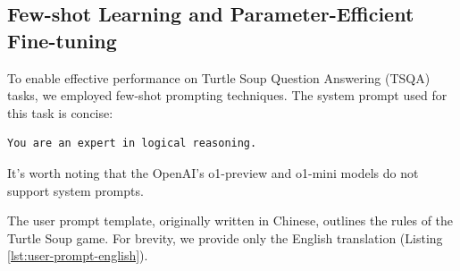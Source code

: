 \documentclass[conference]{IEEEtran}
\begin{document}
\subsection{Few-shot Learning and Parameter-Efficient Fine-tuning}

To enable effective performance on Turtle Soup Question Answering (TSQA) tasks, we employed few-shot prompting techniques. The system prompt used for this task is concise:

\begin{verbatim}
You are an expert in logical reasoning.
\end{verbatim}

It's worth noting that the OpenAI's o1-preview and o1-mini models do not support system prompts.

The user prompt template, originally written in Chinese, outlines the rules of the Turtle Soup game. For brevity, we provide only the English translation (Listing \ref{lst:user-prompt-english}).

\end{document}
